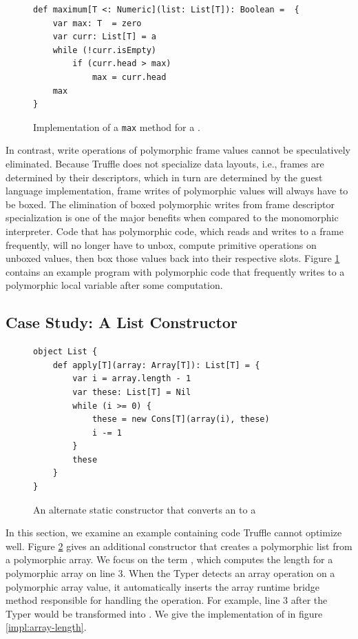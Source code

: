 \begin{figure}[!htb]
\begin{verbatim}
def maximum[T <: Numeric](list: List[T]): Boolean =  {
	var max: T  = zero
	var curr: List[T] = a
	while (!curr.isEmpty) 
		if (curr.head > max)
			max = curr.head 
	max
}
\end{verbatim}
\caption{Implementation of a \texttt{max} method for a .}
\label{impl:list-max}
\end{figure}

In contrast, write operations of polymorphic frame values cannot be speculatively eliminated. 
Because Truffle does not specialize data layouts, i.e., frames are determined by their descriptors, which in turn are determined by the guest language implementation, frame writes of polymorphic values will always have to be boxed.
The elimination of boxed polymorphic writes from frame descriptor specialization is one of the major benefits when compared to the monomorphic interpreter.
Code that has polymorphic code, which reads and writes to a frame frequently, will no longer have to unbox, compute primitive operations on unboxed values, then box those values back into their respective slots.
Figure \ref{impl:list-max} contains an example program with polymorphic code that frequently writes to a polymorphic local variable after some computation.

\subsection{Case Study: A List Constructor}

\begin{figure}[!htb]
\begin{verbatim}
object List {
	def apply[T](array: Array[T]): List[T] = {
		var i = array.length - 1
		var these: List[T] = Nil
		while (i >= 0) {
			these = new Cons[T](array(i), these)
			i -= 1
		}
		these
	}	
}
\end{verbatim}
\caption{An alternate static constructor that converts an  to a }
\label{impl:list-alt-constructor}
\end{figure}

In this section, we examine an example containing code Truffle cannot optimize well.
Figure \ref{impl:list-alt-constructor} gives an additional constructor that creates a polymorphic list from a polymorphic array.
We focus on the term , which computes the length for a polymorphic array on line $3$.
When the Typer detects an array operation on a polymorphic array value, it automatically inserts the array runtime bridge method responsible for handling the operation.
For example, line $3$ after the Typer would be transformed into .
We give the implementation of  in figure \ref{impl:array-length}.

